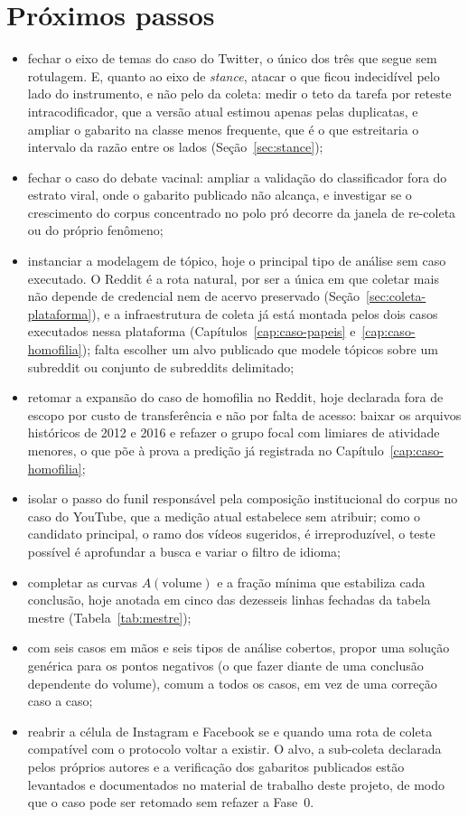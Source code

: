 \section{Próximos passos}

\begin{itemize}
  \item fechar o eixo de temas do caso do Twitter, o único dos três que segue sem
  rotulagem. E, quanto ao eixo de \emph{stance}, atacar o que ficou indecidível pelo
  lado do instrumento, e não pelo da coleta: medir o teto da tarefa por reteste
  intracodificador, que a versão atual estimou apenas pelas duplicatas, e ampliar o
  gabarito na classe menos frequente, que é o que estreitaria o intervalo da razão
  entre os lados (Seção~\ref{sec:stance});
  \item fechar o caso do debate vacinal: ampliar a
  validação do classificador fora do estrato viral, onde o gabarito publicado não
  alcança, e investigar se o crescimento do corpus concentrado no polo pró decorre
  da janela de re-coleta ou do próprio fenômeno;
  \item instanciar a modelagem de tópico, hoje o principal tipo de análise sem caso
  executado. O Reddit é a rota natural, por ser a única em que coletar mais não
  depende de credencial nem de acervo preservado
  (Seção~\ref{sec:coleta-plataforma}), e a infraestrutura de coleta já está montada
  pelos dois casos executados nessa plataforma
  (Capítulos~\ref{cap:caso-papeis} e~\ref{cap:caso-homofilia}); falta escolher um alvo publicado que modele
  tópicos sobre um subreddit ou conjunto de subreddits delimitado;
  \item retomar a expansão do caso de homofilia no Reddit, hoje declarada fora de
  escopo por custo de transferência e não por falta de acesso: baixar os arquivos
  históricos de 2012 e 2016 e refazer o grupo focal com limiares de atividade
  menores, o que põe à prova a predição já registrada no
  Capítulo~\ref{cap:caso-homofilia};
  \item isolar o passo do funil responsável pela composição institucional do corpus
  no caso do YouTube, que a medição atual estabelece sem atribuir; como o candidato
  principal, o ramo dos vídeos sugeridos, é irreproduzível, o teste possível é
  aprofundar a busca e variar o filtro de idioma;
  \item completar as curvas $A(\text{volume})$ e a fração mínima que estabiliza cada
  conclusão, hoje anotada em cinco das dezesseis linhas fechadas da tabela mestre
  (Tabela~\ref{tab:mestre});
  \item com seis casos em mãos e seis tipos de análise cobertos, propor uma solução
  genérica para os pontos negativos (o que fazer diante de uma conclusão dependente
  do volume), comum a todos os casos, em vez de uma correção caso a caso;
  \item reabrir a célula de Instagram e Facebook se e quando uma rota de coleta
  compatível com o protocolo voltar a existir. O alvo, a sub-coleta declarada pelos
  próprios autores e a verificação dos gabaritos publicados estão levantados e
  documentados no material de trabalho deste projeto, de modo que o caso pode ser
  retomado sem refazer a Fase~0.
\end{itemize}

